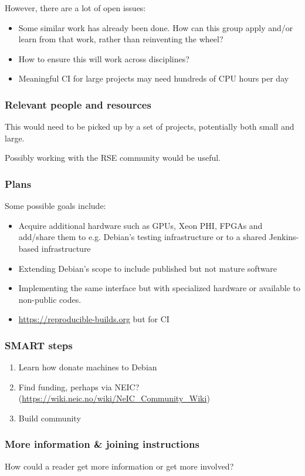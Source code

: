 However, there are a lot of open issues:

\begin{itemize}
\item Some similar work has already been done.  How can this group apply and/or learn from that work, rather than reinventing the wheel?
\item How to ensure this will work across disciplines?
\item Meaningful CI for large projects may need hundreds of CPU hours per day
\end{itemize}


\subsubsection{Relevant people and resources}

This would need to be picked up by a set of projects, potentially both small and large.

Possibly working with the RSE community would be useful.

\subsubsection{Plans}

Some possible goals include:
\begin{itemize}
\item Acquire additional hardware such as GPUs, Xeon PHI, FPGAs and add/share them to e.g. Debian's testing infrastructure or to a shared Jenkins-based infrastructure
\item Extending Debian's scope to include published but not mature software
\item Implementing the same interface but with specialized hardware or available to non-public codes.
\item \url{https://reproducible-builds.org} but for CI 
\end{itemize}

\subsubsection{SMART steps}

\begin{enumerate}
\item Learn how donate machines to Debian
\item Find funding, perhaps via NEIC? (\url{https://wiki.neic.no/wiki/NeIC_Community_Wiki}) 
\item Build community
\end{enumerate}


\subsubsection{More information \& joining instructions}

How could a reader get more information or get more involved?

